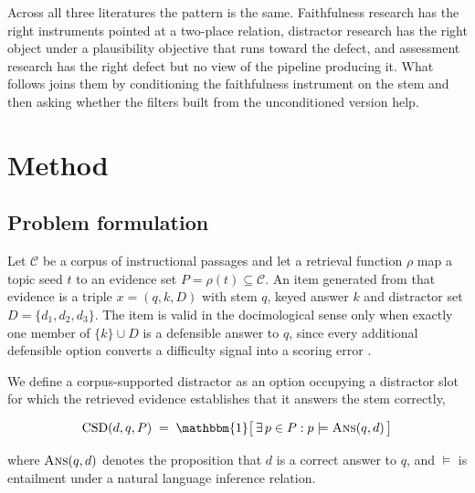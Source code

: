 \documentclass[11pt]{article}
\begin{document}
Across all three literatures the pattern is the same. Faithfulness research has the right instruments pointed at a two-place relation, distractor research has the right object under a plausibility objective that runs toward the defect, and assessment research has the right defect but no view of the pipeline producing it. What follows joins them by conditioning the faithfulness instrument on the stem and then asking whether the filters built from the unconditioned version help.

\section{Method}

\subsection{Problem formulation}

Let $\mathcal{C}$ be a corpus of instructional passages and let a retrieval function $\rho$ map a topic seed $t$ to an evidence set $P = \rho(t) \subseteq \mathcal{C}$. An item generated from that evidence is a triple $x = (q, k, D)$ with stem $q$, keyed answer $k$ and distractor set $D = \{d_1, d_2, d_3\}$. The item is valid in the docimological sense only when exactly one member of $\{k\} \cup D$ is a defensible answer to $q$, since every additional defensible option converts a difficulty signal into a scoring error \citep{rezigalla2024item}.

We define a corpus-supported distractor as an option occupying a distractor slot for which the retrieved evidence establishes that it answers the stem correctly,

\begin{equation}
\mathrm{CSD}(d, q, P) \;=\; \mathbbm{1}\big[\, \exists\, p \in P : p \models \textsc{Ans}(q, d) \,\big]
\end{equation}

where $\textsc{Ans}(q,d)$ denotes the proposition that $d$ is a correct answer to $q$, and $\models$ is entailment under a natural language inference relation.
\end{document}
